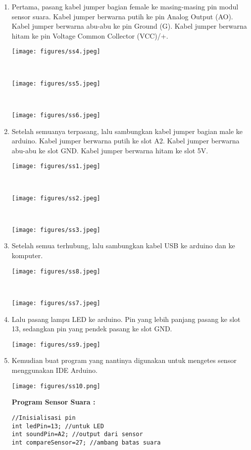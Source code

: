 \begin{enumerate}

\item  Pertama, pasang kabel jumper bagian female ke masing-masing pin modul sensor suara. Kabel jumper berwarna putih ke pin Analog Output (AO). Kabel jumper berwarna abu-abu ke pin Ground (G). Kabel jumper berwarna hitam ke pin Voltage Common Collector (VCC)/+.
\break\\
\centerline{\texttt{[image: figures/ss4.jpeg]}}
\break\\
\centerline{\texttt{[image: figures/ss5.jpeg]}}
\break\\
\centerline{\texttt{[image: figures/ss6.jpeg]}}
\item Setelah semuanya terpasang, lalu sambungkan kabel jumper bagian male ke arduino. Kabel jumper berwarna putih ke slot A2. Kabel jumper berwarna abu-abu ke slot GND. Kabel jumper berwarna hitam ke slot 5V.
\break\\
\centerline{\texttt{[image: figures/ss1.jpeg]}}
\break\\
\centerline{\texttt{[image: figures/ss2.jpeg]}}
\break\\
\centerline{\texttt{[image: figures/ss3.jpeg]}}
\item Setelah semua terhubung, lalu sambungkan kabel USB ke arduino dan ke komputer.
\break\\
\centerline{\texttt{[image: figures/ss8.jpeg]}}
\break\\
\centerline{\texttt{[image: figures/ss7.jpeg]}}
\item Lalu pasang lampu LED ke arduino. Pin yang lebih panjang pasang ke slot 13, sedangkan pin yang pendek pasang ke slot GND.
\break\\
\centerline{\texttt{[image: figures/ss9.jpeg]}}
\item  Kemudian buat program yang nantinya digunakan untuk mengetes sensor menggunakan IDE Arduino.
\break\\
\centerline{\texttt{[image: figures/ss10.png]}}
\break \textbf{Program Sensor Suara :}
\begin{verbatim}
//Inisialisasi pin
int ledPin=13; //untuk LED
int soundPin=A2; //output dari sensor
int compareSensor=27; //ambang batas suara


\end{verbatim}
\end{enumerate}
